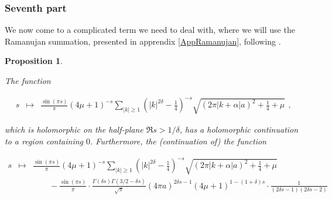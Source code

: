 \documentclass{jams-l}
\newtheorem{proposition}[theorem]{Proposition}
\theoremstyle{definition}
\theoremstyle{remark}
\numberwithin{equation}{section}
\begin{document}
            
        \subsubsection*{\textbf{Seventh part}}
        \label{ASeventhPart}
            
            We now come to a complicated term we need to deal with, where we will use the Ramanujan summation, presented in apprendix \ref{AppRamanujan}, following \cite{MR3677185}.
            
            \begin{proposition}
            \label{PropA7}
            
                The function
                
                \[ \begin{array}{lll}
                        s & \longmapsto & \frac{\sin \left( \pi s \right)}{\pi} \left( 4 \mu + 1 \right)^{-s} \sum\limits_{\left \vert k \right \vert \geqslant 1} \left( \left \vert k \right \vert^{2 \delta} - \frac{1}{4} \right)^{-s} \sqrt{\left( 2 \pi \left \vert k + \alpha \right \vert a \right)^2 + \frac{1}{4} + \mu}
                    \end{array} , \]
                
                \noindent which is holomorphic on the half-plane $\Re s > 1/\delta$, has a holomorphic continuation to a region containing $0$. Furthermore, the (continuation of) the function 
                
                \[ \begin{array}{lll}
                        \scriptstyle s & \scriptstyle \longmapsto & \scriptstyle \frac{\sin \left( \pi s \right)}{\pi} \left( 4 \mu + 1 \right)^{-s} \sum\limits_{\left \vert k \right \vert \geqslant 1} \left( \left \vert k \right \vert^{2 \delta} - \frac{1}{4} \right)^{-s} \sqrt{\left( 2 \pi \left \vert k + \alpha \right \vert a \right)^2 + \frac{1}{4} + \mu} \\[1em]
                        
                        && \qquad \scriptstyle - \frac{\sin \left( \pi s \right)}{\pi} \cdot \frac{\Gamma \left( \delta s \right) \Gamma \left( 3/2 - \delta s \right)}{\sqrt{\pi}} \left( 4 \pi a \right)^{2 \delta s - 1} \left( 4 \mu + 1 \right)^{1 - \left( 1 + \delta \right) s} \cdot \frac{1}{\left( 2 \delta s - 1 \right) \left( 2 \delta s - 2 \right)}
                    \end{array} \]
                

\end{proposition}
\end{document}
